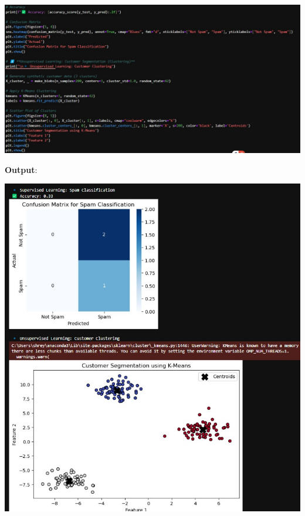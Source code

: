 \documentclass{article}
\begin{document}
\includegraphics[width=16cm,height=12
cm]{Supervised2.jpeg}

\textbf{Output}:

\includegraphics[width=16cm,height=12
cm]{Supervised_Output.jpeg}
\end{document}
